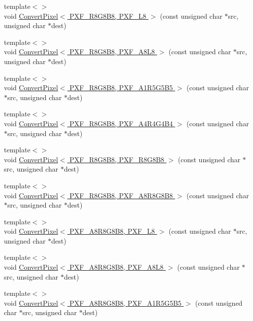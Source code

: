 \begin{DoxyCompactItemize}
{\footnotesize template$<$$>$ }\\void \hyperlink{_convert_pixel_8inl_a9407a2cb0eec9cf3f9fa6fad051219fd}{Convert\+Pixel$<$ P\+X\+F\+\_\+\+R8\+G8\+B8, P\+X\+F\+\_\+\+L8 $>$} (const unsigned char $\ast$src, unsigned char $\ast$dest)
\item 
{\footnotesize template$<$$>$ }\\void \hyperlink{_convert_pixel_8inl_a3aa0d709692fbe2b99db5f3ef803d369}{Convert\+Pixel$<$ P\+X\+F\+\_\+\+R8\+G8\+B8, P\+X\+F\+\_\+\+A8\+L8 $>$} (const unsigned char $\ast$src, unsigned char $\ast$dest)
\item 
{\footnotesize template$<$$>$ }\\void \hyperlink{_convert_pixel_8inl_a2afd6cba518e0ff2bb2c1315faa2f835}{Convert\+Pixel$<$ P\+X\+F\+\_\+\+R8\+G8\+B8, P\+X\+F\+\_\+\+A1\+R5\+G5\+B5 $>$} (const unsigned char $\ast$src, unsigned char $\ast$dest)
\item 
{\footnotesize template$<$$>$ }\\void \hyperlink{_convert_pixel_8inl_a03961d827bf07c392d43082b616303f8}{Convert\+Pixel$<$ P\+X\+F\+\_\+\+R8\+G8\+B8, P\+X\+F\+\_\+\+A4\+R4\+G4\+B4 $>$} (const unsigned char $\ast$src, unsigned char $\ast$dest)
\item 
{\footnotesize template$<$$>$ }\\void \hyperlink{_convert_pixel_8inl_a6715830f488a09bbe4cfd7343843ffc5}{Convert\+Pixel$<$ P\+X\+F\+\_\+\+R8\+G8\+B8, P\+X\+F\+\_\+\+R8\+G8\+B8 $>$} (const unsigned char $\ast$src, unsigned char $\ast$dest)
\item 
{\footnotesize template$<$$>$ }\\void \hyperlink{_convert_pixel_8inl_ae32d8e6b9ece53522851db0e9bd8f6e7}{Convert\+Pixel$<$ P\+X\+F\+\_\+\+R8\+G8\+B8, P\+X\+F\+\_\+\+A8\+R8\+G8\+B8 $>$} (const unsigned char $\ast$src, unsigned char $\ast$dest)
\item 
{\footnotesize template$<$$>$ }\\void \hyperlink{_convert_pixel_8inl_a48f5312a75f47b2f380f8c9988675ed9}{Convert\+Pixel$<$ P\+X\+F\+\_\+\+A8\+R8\+G8\+B8, P\+X\+F\+\_\+\+L8 $>$} (const unsigned char $\ast$src, unsigned char $\ast$dest)
\item 
{\footnotesize template$<$$>$ }\\void \hyperlink{_convert_pixel_8inl_a0eb24381cc789044729013cec394f840}{Convert\+Pixel$<$ P\+X\+F\+\_\+\+A8\+R8\+G8\+B8, P\+X\+F\+\_\+\+A8\+L8 $>$} (const unsigned char $\ast$src, unsigned char $\ast$dest)
\item 
{\footnotesize template$<$$>$ }\\void \hyperlink{_convert_pixel_8inl_ae5ea2bf8495c23fbfb76000ea69f0250}{Convert\+Pixel$<$ P\+X\+F\+\_\+\+A8\+R8\+G8\+B8, P\+X\+F\+\_\+\+A1\+R5\+G5\+B5 $>$} (const unsigned char $\ast$src, unsigned char $\ast$dest)

\end{DoxyCompactItemize}
